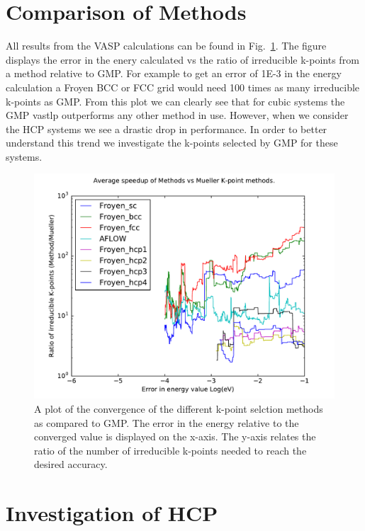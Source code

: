 \documentclass[12pt,prb,reprint]{revtex4-1}
\begin{document}
\section{Comparison of Methods} \label{comparison}

All results from the VASP calculations can be found in
Fig.~\ref{fig:AllvGMP}. The figure displays the error in the enery
calculated vs the ratio of irreducible k-points from a method relative
to GMP. For example to get an error of 1E-3 in the energy calculation
a Froyen BCC or FCC grid would need 100 times as many irreducible
k-points as GMP. From this plot we can clearly see that for cubic
systems the GMP vastlp outperforms any other method in use. However,
when we consider the HCP systems we see a drastic drop in
performance. In order to better understand this trend we investigate
the k-points selected by GMP for these systems.

\begin{figure} %
  \includegraphics{../plots/All_vs_Mueller.pdf}
  \centering
  \caption{A plot of the convergence of the different k-point selction
    methods as compared to GMP. The error in the energy relative to
    the converged value is displayed on the x-axis. The y-axis relates
    the ratio of the number of irreducible k-points needed to reach
    the desired accuracy.}
  \label{fig:AllvGMP}
\end{figure}

\section{Investigation of HCP} \label{HCP}
\end{document}
